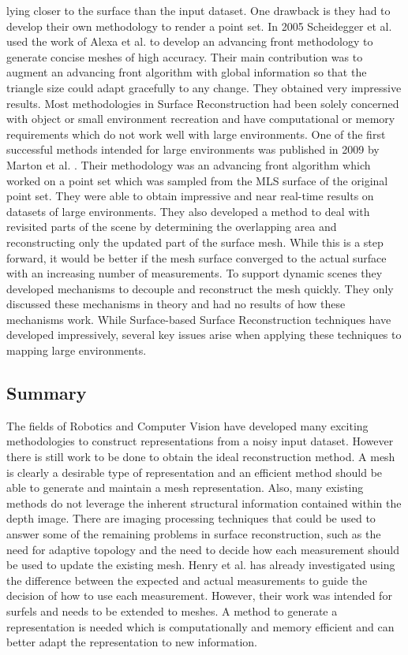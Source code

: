 \documentclass[12pt]{article}
\begin{document}
lying closer to the surface than the input dataset. One drawback is they
had to develop their own methodology to render a point set. In 2005
Scheidegger et al. used the work of Alexa et al. to develop an advancing
front methodology to generate concise meshes of high accuracy. Their main
contribution was to augment an advancing front algorithm with global
information so that the triangle size could adapt gracefully to any change.
They obtained very impressive results. Most methodologies in Surface
Reconstruction had been solely concerned with object or small environment
recreation and have computational or memory requirements which do not work
well with large environments. One of the first successful methods intended
for large environments was published in 2009 by Marton et al.
\cite{Marton2009}. Their methodology was an advancing front algorithm which
worked on a point set which was sampled from the MLS surface of the
original point set. They were able to obtain impressive and near real-time
results on datasets of large environments. They also developed a method to
deal with revisited parts of the scene by determining the overlapping area
and reconstructing only the updated part of the surface mesh. While this is a
step forward, it would be better if the mesh surface converged
to the actual surface with an increasing number of measurements. To support
dynamic scenes they developed mechanisms to decouple and reconstruct the
mesh quickly. They only discussed these mechanisms in theory and had no
results of how these mechanisms work. While Surface-based Surface Reconstruction
techniques have developed impressively, several key issues arise
when applying these techniques to mapping large environments. 

\subsection{Summary}

The fields of Robotics and Computer Vision have developed many exciting
methodologies to construct representations from a noisy input dataset.
However there is still work to be done to obtain the ideal reconstruction
method. A mesh is clearly a desirable type of representation and an
efficient method should be able to generate and maintain a mesh
representation. Also, many existing methods do not leverage the inherent
structural information contained within the depth image. There are imaging
processing techniques that could be used to answer some of the remaining
problems in surface reconstruction, such as the need for adaptive topology
and the need to decide how each measurement should be used to update the
existing mesh. Henry et al. \cite{Henry2012} has already investigated using
the difference between the expected and actual measurements to guide the
decision of how to use each measurement. However, their work was intended
for surfels and needs to be extended to meshes. A method to generate a
representation is needed which is computationally and memory efficient and
can better adapt the representation to new information. 
\end{document}
